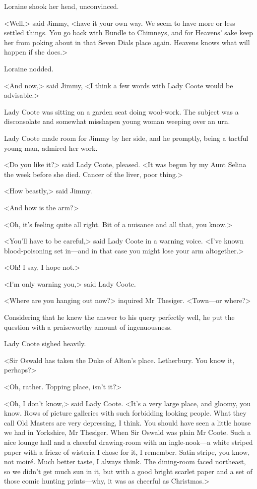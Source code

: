 Loraine shook her head, unconvinced.

<Well,> said Jimmy, <have it your own way. We seem to have more or less settled things. You go back with Bundle to Chimneys, and for Heavens' sake keep her from poking about in that Seven Dials place again. Heavens knows what will happen if she does.>

Loraine nodded.

<And now,> said Jimmy, <I think a few words with Lady Coote would be advisable.>

Lady Coote was sitting on a garden seat doing wool-work. The subject was a disconsolate and somewhat misshapen young woman weeping over an urn.

Lady Coote made room for Jimmy by her side, and he promptly, being a tactful young man, admired her work.

<Do you like it?> said Lady Coote, pleased. <It was begun by my Aunt Selina the week before she died. Cancer of the liver, poor thing.>

<How beastly,> said Jimmy.

<And how is the arm?>

<Oh, it's feeling quite all right. Bit of a nuisance and all that, you know.>

<You'll have to be careful,> said Lady Coote in a warning voice. <I've known blood-poisoning set in—and in that case you might lose your arm altogether.>

<Oh! I say, I hope not.>

<I'm only warning you,> said Lady Coote.

<Where are you hanging out now?> inquired Mr Thesiger. <Town—or where?>

Considering that he knew the answer to his query perfectly well, he put the question with a praiseworthy amount of ingenuousness.

Lady Coote sighed heavily.

<Sir Oswald has taken the Duke of Alton's place. Letherbury. You know it, perhaps?>

<Oh, rather. Topping place, isn't it?>

<Oh, I don't know,> said Lady Coote. <It's a very large place, and gloomy, you know. Rows of picture galleries with such forbidding looking people. What they call Old Masters are very depressing, I think. You should have seen a little house we had in Yorkshire, Mr Thesiger. When Sir Oswald was plain Mr Coote. Such a nice lounge hall and a cheerful drawing-room with an ingle-nook—a white striped paper with a frieze of wisteria I chose for it, I remember. Satin stripe, you know, not moiré. Much better taste, I always think. The dining-room faced northeast, so we didn't get much sun in it, but with a good bright scarlet paper and a set of those comic hunting prints—why, it was as cheerful as Christmas.>

